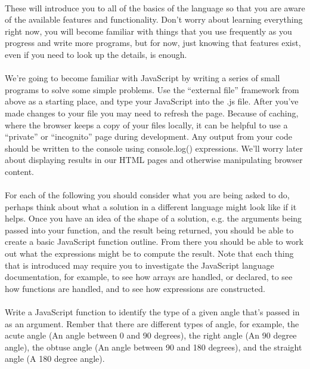 \documentclass[10pt, a4paper]{article}
\begin{document}
\paragraph{} These will introduce you to all of the basics of the language so that you are aware of the available features and functionality. Don't worry about learning everything right now, you will become familiar with things that you use frequently as you progress and write more programs, but for now, just knowing that features exist, even if you need to look up the details, is enough.


\paragraph{} We're going to become familiar with JavaScript by writing a series of small programs to solve some simple problems. Use the ``external file'' framework from above as a starting place, and type your JavaScript into the .js file. After you've made changes to your file you may need to refresh the page. Because of caching, where the browser keeps a copy of your files locally, it can be helpful to use a ``private'' or ``incognito'' page during development. Any output from your code should be written to the console using console.log() expressions. We'll worry later about displaying results in our HTML pages and otherwise manipulating browser content.

\paragraph{} For each of the following you should consider what you are being asked to do, perhaps think about what a solution in a different language might look like if it helps. Once you have an idea of the shape of a solution, e.g. the arguments being passed into your function, and the result being returned, you should be able to create a basic JavaScript function outline. From there you should be able to work out what the expressions might be to compute the result. Note that each thing that is introduced may require you to investigate the JavaScript language documentation, for example, to see how arrays are handled, or declared, to see how functions are handled, and to see how expressions are constructed.

\paragraph{} Write a JavaScript function to identify the type of a given angle that's passed in as an argument. Rember that there are different types of angle, for example, the acute angle (An angle between 0 and 90 degrees), the right angle (An 90 degree angle), the obtuse angle (An angle between 90 and 180 degrees), and the straight angle (A 180 degree angle).
\end{document}
